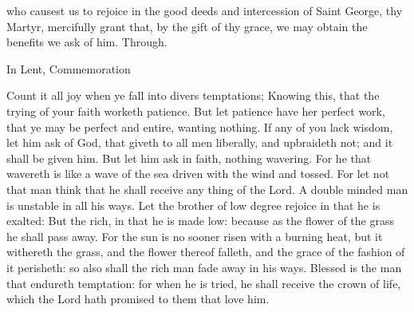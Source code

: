 \clearpage
{}


\introit

\collect
{} who causest us to rejoice in the good deeds and intercession of Saint George, thy Martyr, mercifully grant that, by the gift of thy grace, we may obtain the benefits we ask of him. Through.
\begin{rubric}
    In Lent, Commemoration %
\end{rubric}

 Count it all joy when ye fall into divers temptations; Knowing this, that the trying of your faith worketh patience. But let patience have her perfect work, that ye may be perfect and entire, wanting nothing. If any of you lack wisdom, let him ask of God, that giveth to all men liberally, and upbraideth not; and it shall be given him. But let him ask in faith, nothing wavering. For he that wavereth is like a wave of the sea driven with the wind and tossed. For let not that man think that he shall receive any thing of the Lord. A double minded man is unstable in all his ways. Let the brother of low degree rejoice in that he is exalted: But the rich, in that he is made low: because as the flower of the grass he shall pass away. For the sun is no sooner risen with a burning heat, but it withereth the grass, and the flower thereof falleth, and the grace of the fashion of it perisheth: so also shall the rich man fade away in his ways. Blessed is the man that endureth temptation: for when he is tried, he shall receive the crown of life, which the Lord hath promised to them that love him.

